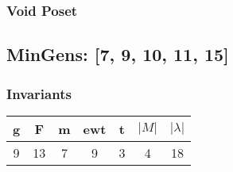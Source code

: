 \documentclass[a4paper]{article}
\begin{document}
\hfill\begin{minipage}{0.48\textwidth}
\subsubsection*{Void Poset}
\centering
{}
\end{minipage}
\newpage\subsection{MinGens: [7, 9, 10, 11, 15]}
\noindent\begin{minipage}{0.6\textwidth}
\subsubsection*{Invariants}
\centering
\begin{tabular}{|c|c|c|c|c|c|c|}
\toprule
g & F & m & ewt & t & \(|M|\) & \(|\lambda|\) \\
\midrule
9 & 13 & 7 & 9 & 3 & 4 & 18 \\
\bottomrule
\end{tabular}
\end{minipage}%
\end{document}
